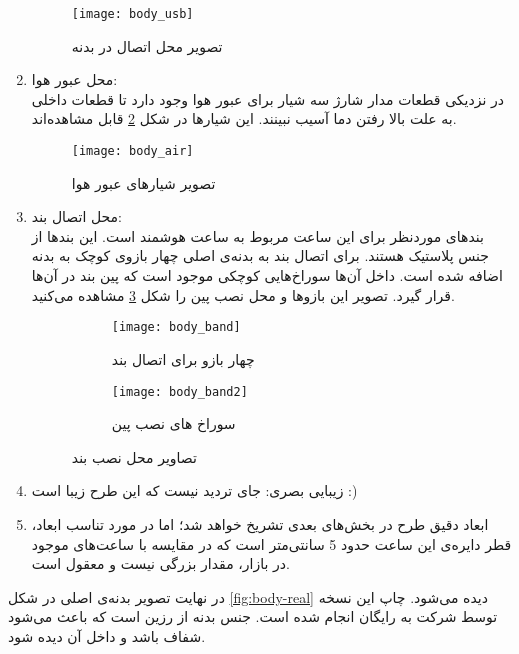 \begin{enumerate}
	\begin{figure}[h]
		\centering
		\texttt{[image: body\_usb]}
		\caption{تصویر محل اتصال  در بدنه}
		\label{fig:body-usb}
	\end{figure}
	
	\item محل عبور هوا: \\
	در نزدیکی قطعات مدار شارژ سه شیار برای عبور هوا وجود دارد تا قطعات داخلی به علت بالا رفتن دما آسیب نبینند. این شیارها در شکل \ref{fig:body-air} قابل مشاهده‌اند.
	
	\begin{figure}[h]
		\centering
		\texttt{[image: body\_air]}
		\caption{تصویر شیارهای عبور هوا}
		\label{fig:body-air}
	\end{figure}

	\item محل اتصال بند: \\
	بندهای موردنظر برای این ساعت مربوط به ساعت هوشمند  است. این بندها از جنس پلاستیک هستند. برای اتصال بند به بدنه‌ی اصلی چهار بازوی کوچک به بدنه اضافه شده است. داخل آن‌ها سوراخ‌هایی کوچکی موجود است که پین بند در آن‌ها قرار گیرد. تصویر این بازوها و محل نصب پین را شکل \ref{fig:body-band} مشاهده می‌کنید.
	
	\begin{figure}[h]
		\centering
		\begin{subfigure}{0.4\textwidth}
			\centering
			\texttt{[image: body\_band]}
			\caption{چهار بازو برای اتصال بند}
		\end{subfigure}
		\begin{subfigure}{0.3\textwidth}
			\centering
			\texttt{[image: body\_band2]}
			\caption{سوراخ های نصب پین}
		\end{subfigure}
		\caption{تصاویر محل نصب بند}
		\label{fig:body-band}
	\end{figure}

	\item زیبایی بصری: جای تردید نیست که این طرح زیبا است :)
	\item ابعاد دقیق طرح در بخش‌های بعدی تشریخ خواهد شد؛ اما در مورد تناسب ابعاد، قطر دایره‌ی این ساعت حدود 5 سانتی‌متر است که در مقایسه با ساعت‌های موجود در بازار، مقدار بزرگی نیست و معقول است.
\end{enumerate}

در نهایت تصویر بدنه‌ی اصلی در شکل \ref{fig:body-real} دیده می‌شود. چاپ این نسخه توسط شرکت \cite{PCBWay} به رایگان انجام شده است. جنس بدنه از رزین است که باعث می‌شود شفاف باشد و داخل آن دیده شود.

